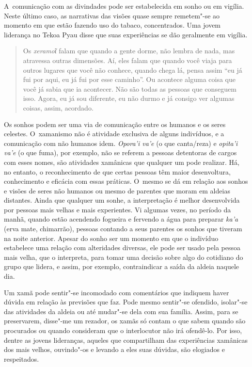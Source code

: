A~comunicação com as divindades pode ser estabelecida em sonho ou em
vigília. Neste último caso, as narrativas das visões quase sempre
remetem"-se ao momento em que estão fazendo uso do tabaco, concentrados.
Uma jovem liderança no Tekoa Pyau disse que suas experiências se dão
geralmente em vigília.

\begin{quote}
Os \emph{xeramoῖ} falam que quando a gente dorme, não lembra de nada,
mas atravessa outras dimensões. Aí, eles falam que quando você viaja
para outros lugares que você não conhece, quando chega lá, pensa assim
``eu já fui por aqui, eu já fui por esse caminho''. Ou acontece alguma
coisa que você já sabia que ia acontecer. Não são todas as pessoas que
conseguem isso. Agora, eu já sou diferente, eu não durmo e já consigo
ver algumas coisas, assim, acordado.
\end{quote}

Os sonhos podem ser uma via de comunicação entre os humanos e os seres
celestes. O~xamanismo não é atividade exclusiva de alguns indivíduos, e
a comunicação com não humanos idem. \emph{Opora’i va’e} (o que canta/reza) e
\emph{opita’i va’e} (o que fuma), por exemplo, não se referem a pessoas
detentoras de cargos com esses nomes, são atividades xamânicas que
qualquer um pode realizar. Há, no entanto, o reconhecimento de que
certas pessoas têm maior desenvoltura, conhecimento e eficácia com
essas práticas. O~mesmo se dá em relação aos sonhos e visões de seres
não humanos ou mesmo de parentes que moram em aldeias distantes. Ainda
que qualquer um sonhe, a interpretação é melhor desenvolvida por
pessoas mais velhas e mais experientes. Vi algumas vezes, no período da
manhã, quando estão acendendo fogueira e fervendo a água para preparar
\emph{ka’a} (erva mate, chimarrão), pessoas contando a seus parentes os sonhos
que tiveram na noite anterior. Apesar do sonho ser um momento em que o
indivíduo estabelece uma relação com alteridades diversas, ele pode ser
usado pela pessoa mais velha, que o interpreta, para tomar uma decisão
sobre algo do cotidiano do grupo que lidera, e assim, por exemplo,
contraindicar a saída da aldeia naquele dia.

Um xamã pode sentir"-se incomodado com comentários que indiquem haver
dúvida em relação às previsões que faz. Pode mesmo sentir"-se ofendido,
isolar"-se das atividades da aldeia ou até mudar"-se dela com sua
família. Assim, para se preservarem, disse"-me um rezador, os xamãs só
contam o que sabem quando são procurados ou quando consideram que o
interlocutor não irá ofendê-lo. Por isso, dentre as jovens lideranças,
aqueles que compartilham das experiências xamânicas dos mais velhos,
ouvindo"-os e levando a eles suas dúvidas, são elogiados e respeitados.

